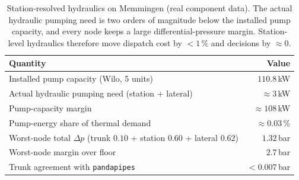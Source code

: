 \begin{table}[t]
\centering
\caption{Station-resolved hydraulics on Memmingen (real component data). The actual hydraulic
pumping need is two orders of magnitude below the installed pump capacity, and every node keeps a
large differential-pressure margin. Station-level hydraulics therefore move dispatch cost by
$<1$\,\% and decisions by $\approx 0$.}
\label{tab:hydraulics}
\begin{tabular}{lr}
\hline
Quantity & Value \\
\hline
Installed pump capacity (Wilo, 5 units) & $110.8$\,kW \\
Actual hydraulic pumping need (station + lateral) & $\approx 3$\,kW \\
Pump-capacity margin & $\approx 108$\,kW \\
Pump-energy share of thermal demand & $\approx 0.03$\,\% \\
Worst-node total $\Delta p$ (trunk $0.10$ + station $0.60$ + lateral $0.62$) & $1.32$\,bar \\
Worst-node margin over floor & $2.7$\,bar \\
Trunk agreement with \texttt{pandapipes} & $<0.007$\,bar \\
\hline
\end{tabular}
\end{table}
